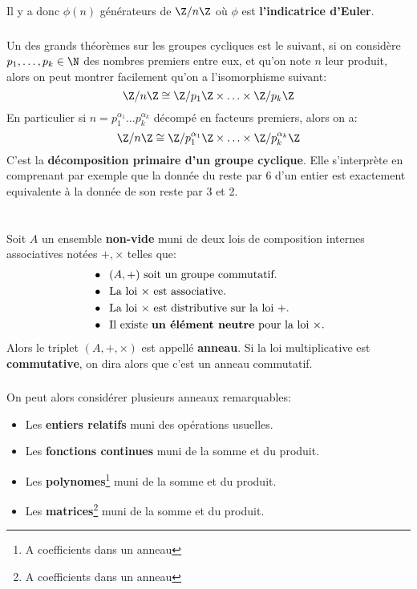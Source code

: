 Il y a donc \( \phi(n) \) générateurs de  \( \Z/n\Z \) où \( \phi \) est \textbf{l'indicatrice d'Euler}.
\subsection*{}
Un des grands théorèmes sur les groupes cycliques est le suivant, si on considère \( p_1, \ldots, p_k \in \N \) des nombres premiers entre eux, et qu'on note \( n \) leur produit, alors on peut montrer facilement qu'on a l'isomorphisme suivant:
\[ 
   \Z/n \Z \cong \Z/ p_1 \Z \times \ldots \times \Z/ p_k \Z
\]
En particulier si \( n = p_1^{\alpha_1} \ldots p_k^{\alpha_k} \) décompé en facteurs premiers, alors on a:
\[ 
   \Z/n \Z \cong \Z/ p_1^{ \alpha_1} \Z \times \ldots \times \Z/ p_k^{ \alpha_k} \Z
\]
C'est la \textbf{décomposition primaire d'un groupe cyclique}. Elle s'interprète en comprenant par exemple que la donnée du reste par 6 d'un entier est exactement equivalente à la donnée de son reste par 3 et 2.

\chapter*{}
Soit \(A\) un ensemble \textbf{non-vide} muni de deux lois de composition internes associatives notées \(+, \times\) telles que:
\begin{align*}
   &\bullet \;\; (A, +) \text{ soit un groupe commutatif.} \\
   &\bullet \;\; \text{La loi \(\times\) est associative.}\\
   &\bullet \;\; \text{La loi \(\times\) est distributive sur la loi \(+\).}\\
   &\bullet \;\; \text{Il existe \textbf{un élément neutre} pour la loi \(\times\).}
\end{align*}
Alors le triplet \((A, +, \times)\) est appellé \textbf{anneau}. Si la loi multiplicative est \textbf{commutative}, on dira alors que c'est un anneau commutatif.
\subsection*{}
On peut alors considérer plusieurs anneaux remarquables:
\begin{itemize}
   \item Les \textbf{entiers relatifs} muni des opérations usuelles.
   \item Les \textbf{fonctions continues} muni de la somme et du produit.
   \item Les \textbf{polynomes}\footnote[1]{A coefficients dans un anneau} muni de la somme et du produit.
   \item Les \textbf{matrices}\footnote[1]{A coefficients dans un anneau} muni de la somme et du produit.
\end{itemize}

